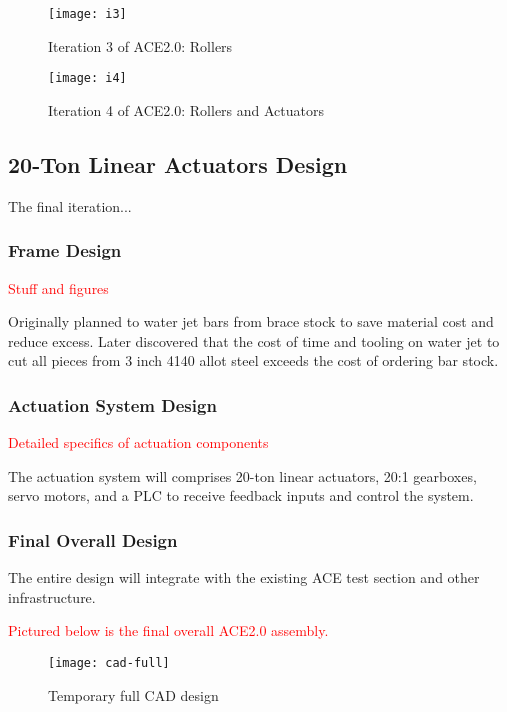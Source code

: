 \begin{figure}[ht]
    \centering
    \texttt{[image: i3]}
    \caption{Iteration 3 of ACE2.0: Rollers}
    \label{fig:i3}
\end{figure}

\begin{figure}[ht]
    \centering
    \texttt{[image: i4]}
    \caption{Iteration 4 of ACE2.0: Rollers and Actuators}
    \label{fig:i4}
\end{figure}

\subsection{20-Ton Linear Actuators Design}

The final iteration...

\subsubsection{Frame Design}

\textcolor{red}{Stuff and figures}

Originally planned to water jet bars from brace stock to save material cost and reduce excess. Later discovered that the cost of time and tooling on water jet to cut all pieces from 3 inch 4140 allot steel exceeds the cost of ordering bar stock.

\subsubsection{Actuation System Design}

\textcolor{red}{Detailed specifics of actuation components}

The actuation system will comprises 20-ton linear actuators, 20:1 gearboxes, servo motors, and a PLC to receive feedback inputs and control the system.

\subsubsection{Final Overall Design}

The entire design will integrate with the existing ACE test section and other infrastructure.

\textcolor{red}{Pictured below is the final overall ACE2.0 assembly.}

\begin{figure}[ht!]
    \centering
    \texttt{[image: cad-full]}
    \caption{Temporary full CAD design}
    \label{fig:cad-full}
\end{figure}

